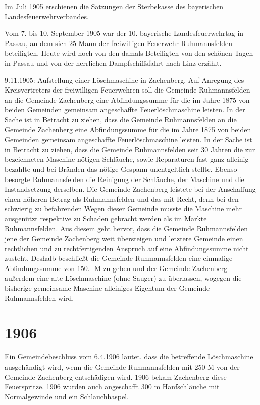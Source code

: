 \documentclass[12pt,a4paper]{book}
\begin{document}
Im Juli 1905 erschienen die Satzungen der Sterbekasse des bayerischen
Landesfeuerwehrverbandes.

Vom 7. bis 10. September 1905 war der 10. bayerische Landesfeuerwehrtag in
Passau, an dem sich 25 Mann der freiwilligen Feuerwehr Ruhmannsfelden
beteiligten. Heute wird noch von den damals Beteiligten von den schönen Tagen in
Passau und von der herrlichen Dampfschiffsfahrt nach Linz erzählt.

9.11.1905: Aufstellung einer Löschmaschine in Zachenberg. Auf Anregung des
Kreisvertreters der freiwilligen Feuerwehren soll die Gemeinde Ruhmannsfelden an
die Gemeinde Zachenberg eine Abfindungssumme für die im Jahre 1875 von beiden
Gemeinden gemeinsam angeschaffte Feuerlöschmaschine leisten. In der Sache ist in
Betracht zu ziehen, dass die Gemeinde Ruhmannsfelden an die Gemeinde Zachenberg
eine Abfindungssumme für die im Jahre 1875 von beiden Gemeinden gemeinsam
angeschaffte Feuerlöschmaschine leisten. In der Sache ist in Betracht zu ziehen,
dass die Gemeinde Ruhmannsfelden seit 30 Jahren die zur bezeichneten Maschine
nötigen Schläuche, sowie Reparaturen fast ganz alleinig bezahlte und bei Bränden
das nötige Gespann unentgeltlich stellte. Ebenso besorgte Ruhmannsfelden die
Reinigung der Schläuche, der Maschine und die Instandsetzung derselben. Die
Gemeinde Zachenberg leistete bei der Anschaffung einen höheren Betrag als
Ruhmannsfelden und das mit Recht, denn bei den schwierig zu befahrenden Wegen
dieser Gemeinde musste die Maschine mehr ausgenützt respektive zu Schaden
gebracht werden als im Markte Ruhmannsfelden. Aus diesem geht hervor, dass die
Gemeinde Ruhmannsfelden jene der Gemeinde Zachenberg weit übersteigen und
letztere Gemeinde einen rechtlichen und zu rechtfertigenden Anspruch auf eine
Abfindungssumme nicht zusteht. Deshalb beschließt die Gemeinde Ruhmannsfelden
eine einmalige Abfindungssumme von 150.- M zu geben und der Gemeinde Zachenberg
außerdem eine alte Löschmaschine (ohne Sauger) zu überlassen, wogegen die
bisherige gemeinsame Maschine alleiniges Eigentum der Gemeinde Ruhmannsfelden
wird.

\section*{1906}

Ein Gemeindebeschluss vom 6.4.1906 lautet, dass die betreffende Löschmaschine
ausgehändigt wird, wenn die Gemeinde Ruhmannsfelden mit 250 M von der Gemeinde
Zachenberg entschädigen wird. 1906 bekam Zachenberg diese Feuerspritze. 1906
wurden auch angeschafft 300 m Hanfschläuche mit Normalgewinde und ein
Schlauchhaspel.
\end{document}
